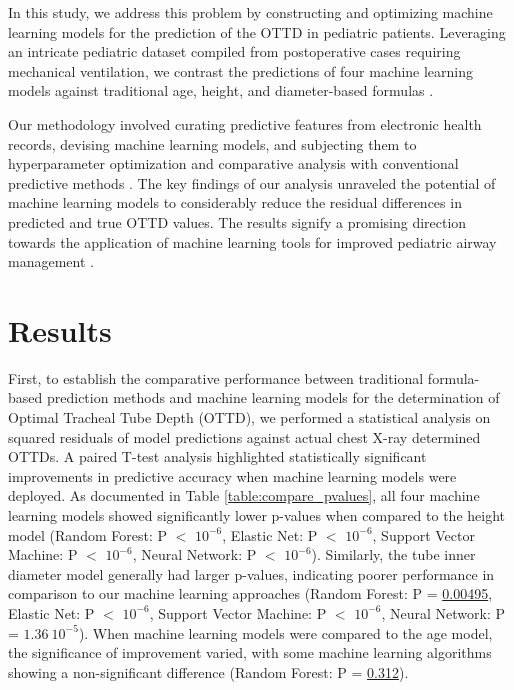 \documentclass[11pt]{article}
\begin{document}
In this study, we address this problem by constructing and optimizing machine learning models for the prediction of the OTTD in pediatric patients. Leveraging an intricate pediatric dataset compiled from postoperative cases requiring mechanical ventilation, we contrast the predictions of four machine learning models against traditional age, height, and diameter-based formulas \cite{Kim2020DifferentCO, Kerrey2009APC}. 

Our methodology involved curating predictive features from electronic health records, devising machine learning models, and subjecting them to hyperparameter optimization and comparative analysis with conventional predictive methods \cite{Sharma2013EndotrachealIT, Ideris2017SelectionOA}. The key findings of our analysis unraveled the potential of machine learning models to considerably reduce the residual differences in predicted and true OTTD values. The results signify a promising direction towards the application of machine learning tools for improved pediatric airway management \cite{Yoo2021DeepLF, Tareerath2021AccuracyOA}.

\section*{Results}

First, to establish the comparative performance between traditional formula-based prediction methods and machine learning models for the determination of Optimal Tracheal Tube Depth (OTTD), we performed a statistical analysis on squared residuals of model predictions against actual chest X-ray determined OTTDs. A paired T-test analysis highlighted statistically significant improvements in predictive accuracy when machine learning models were deployed. As documented in Table \ref{table:compare_pvalues}, all four machine learning models showed significantly lower p-values when compared to the height model (Random Forest: P $<$ \hyperlink{A0a}{$10^{-6}$}, Elastic Net: P $<$ \hyperlink{A1a}{$10^{-6}$}, Support Vector Machine: P $<$ \hyperlink{A2a}{$10^{-6}$}, Neural Network: P $<$ \hyperlink{A3a}{$10^{-6}$}). Similarly, the tube inner diameter model generally had larger p-values, indicating poorer performance in comparison to our machine learning approaches (Random Forest: P = \hyperlink{A0c}{0.00495}, Elastic Net: P $<$ \hyperlink{A1c}{$10^{-6}$}, Support Vector Machine: P $<$ \hyperlink{A2c}{$10^{-6}$}, Neural Network: P = \hyperlink{A3c}{$1.36\ 10^{-5}$}). When machine learning models were compared to the age model, the significance of improvement varied, with some machine learning algorithms showing a non-significant difference (Random Forest: P = \hyperlink{A0b}{0.312}).
\end{document}
